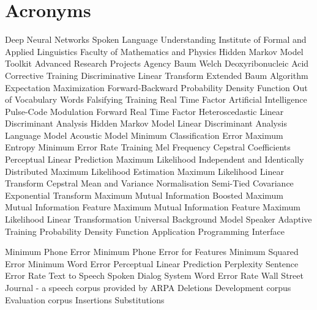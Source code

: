 \chapter{Acronyms}
\label{cha:acronyms}

\begin{acronym}[TDMA]
     {Deep Neural Networks}
     {Spoken Language Understanding}
     {Institute of Formal and Applied Linguistics}
     {Faculty of Mathematics and Physics}
     {Hidden Markov Model Toolkit}
     {Advanced Research Projects Agency}
     {Baum Welch}
     {Deoxyribonucleic Acid}
     {Corrective Training}
     {Discriminative Linear Transform}
     {Extended Baum Algorithm}
     {Expectation Maximization}
     {Forward-Backward}
     {Probability Density Function}
     {Out of Vocabulary Words}
     {Falsifying Training}
     {Real Time Factor}
     {Artificial Intelligence}
     {Pulse-Code Modulation}
     {Forward Real Time Factor}
     {Heteroscedastic Linear Discriminant Analysis}
     {Hidden Markov Model}
     {Linear Discriminant Analysis}
     {Language Model}
     {Acoustic Model}
     {Minimum Classification Error}
     {Maximum Entropy}
     {Minimum Error Rate Training}
     {Mel Frequency Cepstral Coefficients}
     {Perceptual Linear Prediction}
     {Maximum Likelihood}
     {Independent and Identically Distributed}
     {Maximum Likelihood Estimation}
     {Maximum Likelihood Linear Transform}
     {Cepstral Mean and Variance Normalisation}
     {Semi-Tied Covariance}
     {Exponential Transform}
     {Maximum Mutual Information}
     {Boosted Maximum Mutual Information}
     {Feature Maximum Mutual Information}
     {Feature Maximum Likelihood Linear Transformation}
     {Universal Background Model}
     {Speaker Adaptive Training}
     {Probability Density Function}
     {Application Programming Interface}

     {Minimum Phone Error}
     {Minimum Phone Error for Features}
     {Minimum Squared Error}
     {Minimum Word Error}
     {Perceptual Linear Prediction}
     {Perplexity}
     {Sentence Error Rate}
     {Text to Speech}
     {Spoken Dialog System}
     {Word Error Rate}
     {Wall Street Journal - a speech corpus provided by ARPA}
     {Deletions}
     {Development corpus}
     {Evaluation corpus}
     {Insertions}
     {Substitutions}
\end{acronym}


